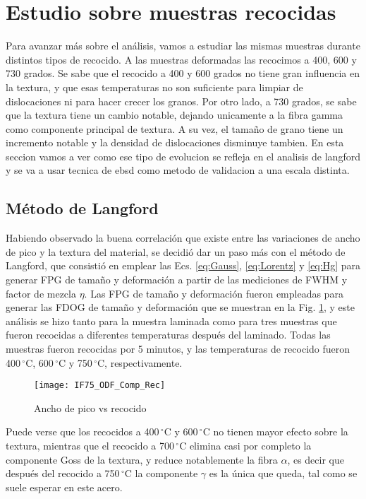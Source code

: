 \section{Estudio sobre muestras recocidas}\label{S:IFRec}
Para avanzar más sobre el análisis, vamos a estudiar las mismas muestras durante distintos tipos de recocido. A las muestras deformadas las recocimos a 400, 600 y 730 grados. Se sabe que el recocido a 400 y 600 grados no tiene gran influencia en la textura, y que esas temperaturas no son suficiente para limpiar de dislocaciones ni para hacer crecer los granos. Por otro lado, a 730 grados, se sabe que la textura tiene un cambio notable, dejando unicamente a la fibra gamma como componente principal de textura. A su vez, el tamaño de grano tiene un incremento notable y la densidad de dislocaciones disminuye tambien.
En esta seccion vamos a ver como ese tipo de evolucion se refleja en el analisis de langford y se va a usar tecnica de ebsd como metodo de validacion a una escala distinta.

\subsection{Método de Langford}\label{SS:IFRecLang}
Habiendo observado la buena correlación que existe entre las variaciones de ancho de pico y la textura del material, se decidió dar un paso más con el método de Langford, que consistió en emplear las Ecs. \ref{eq:Gauss}, \ref{eq:Lorentz} y \ref{eq:Hg} para generar FPG de tamaño y deformación a partir de las mediciones de FWHM y factor de mezcla $\eta$.
Las FPG de tamaño y deformación fueron empleadas para generar las FDOG de tamaño y deformación que se muestran en la Fig. \ref{fig:IFMicroRecocido}, y este análisis se hizo tanto para la muestra laminada como para tres muestras que fueron recocidas a diferentes temperaturas después del laminado.
Todas las muestras fueron recocidas por 5 minutos, y las temperaturas de recocido fueron 400\,$^{\circ}$C, 600\,$^{\circ}$C y 750\,$^{\circ}$C, respectivamente.

\begin{figure}[!htb]
  \centering
  \texttt{[image: IF75\_ODF\_Comp\_Rec]}
  \caption{Ancho de pico vs recocido}
  \label{fig:IFMicroRecocido}
\end{figure}

Puede verse que los recocidos a 400\,$^{\circ}$C y 600\,$^{\circ}$C no tienen mayor efecto sobre la textura, mientras que el recocido a 700\,$^{\circ}$C elimina casi por completo la componente Goss de la textura, y reduce notablemente la fibra $\alpha$, es decir que después del recocido a 750\,$^{\circ}$C la componente $\gamma$ es la única que queda, tal como se suele esperar en este acero.


